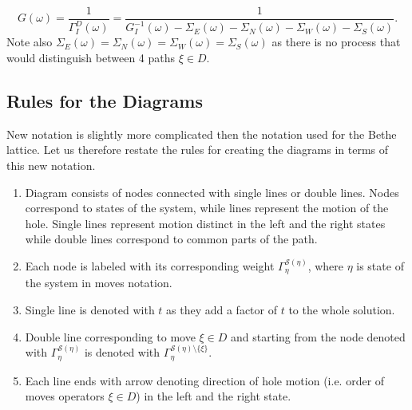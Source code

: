 \documentclass{article}
\begin{document}
\begin{center}
\end{center}
\begin{equation}
    G(\omega) = \frac{1}{\Gamma_I^{D}(\omega)} = \frac{1}{G_I^{-1}(\omega) - \Sigma_E(\omega) - \Sigma_N(\omega) - \Sigma_W(\omega) - \Sigma_S(\omega)}.
\end{equation}
Note also $\Sigma_E(\omega) = \Sigma_N(\omega) = \Sigma_W(\omega) = \Sigma_S(\omega)$ as there is no process that would distinguish between 4 paths $\xi \in D$.

\subsection{Rules for the Diagrams}
New notation is slightly more complicated then the notation used for the Bethe lattice. Let us therefore restate the rules for creating the diagrams in terms of this new notation. 
\begin{enumerate}
    \item Diagram consists of nodes connected with single lines or double lines. Nodes correspond to states of the system, while lines represent the motion of the hole. Single lines represent motion distinct in the left and the right states while double lines correspond to common parts of the path.
    \item Each node is labeled with its corresponding weight $\Gamma_{\eta}^{\mathcal{S}(\eta)}$, where $\eta$ is state of the system in moves notation.
    \item Single line is denoted with $t$ as they add a factor of $t$ to the whole solution.
    \item Double line corresponding to move $\xi \in D$ and starting from the node denoted with $\Gamma_{\eta}^{\mathcal{S}(\eta)}$ is denoted with $\Gamma_{\eta}^{\mathcal{S}(\eta) \setminus \{\xi\}}$.
    \item Each line ends with arrow denoting direction of hole motion (i.e. order of moves operators $\xi \in D$) in the left and the right state.
\end{enumerate}
\end{document}
